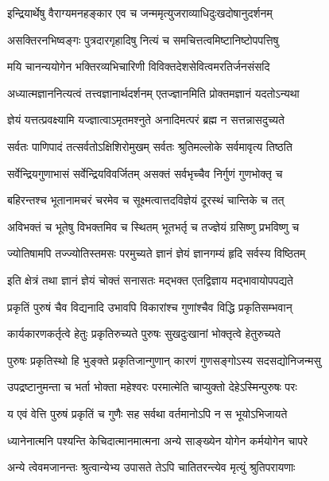 \twolineshloka
{इन्द्रियार्थेषु वैराग्यमनहङ्कार एव च}
{जन्ममृत्युजराव्याधिदुःखदोषानुदर्शनम्}%

\twolineshloka
{असक्तिरनभिष्वङ्गः पुत्रदारगृहादिषु}
{नित्यं च समचित्तत्वमिष्टानिष्टोपपत्तिषु}%

\twolineshloka
{मयि चानन्ययोगेन भक्तिरव्यभिचारिणी}
{विविक्तदेशसेवित्वमरतिर्जनसंसदि}%

\twolineshloka
{अध्यात्मज्ञाननित्यत्वं तत्त्वज्ञानार्थदर्शनम्}
{एतज्ज्ञानमिति प्रोक्तमज्ञानं यदतोऽन्यथा}%

\twolineshloka
{ज्ञेयं यत्तत्प्रवक्ष्यामि यज्ज्ञात्वाऽमृतमश्नुते}
{अनादिमत्परं ब्रह्म न सत्तन्नासदुच्यते}%

\twolineshloka
{सर्वतः पाणिपादं तत्सर्वतोऽक्षिशिरोमुखम्}
{सर्वतः श्रुतिमल्लोके सर्वमावृत्य तिष्ठति}%

\twolineshloka
{सर्वेन्द्रियगुणाभासं सर्वेन्द्रियविवर्जितम्}
{असक्तं सर्वभृच्चैव निर्गुणं गुणभोक्तृ च}%

\twolineshloka
{बहिरन्तश्च भूतानामचरं चरमेव च}
{सूक्ष्मत्वात्तदविज्ञेयं दूरस्थं चान्तिके च तत्}%

\twolineshloka
{अविभक्तं च भूतेषु विभक्तमिव च स्थितम्}
{भूतभर्तृ च तज्ज्ञेयं ग्रसिष्णु प्रभविष्णु च}%

\twolineshloka
{ज्योतिषामपि तज्ज्योतिस्तमसः परमुच्यते}
{ज्ञानं ज्ञेयं ज्ञानगम्यं हृदि सर्वस्य विष्ठितम्}%

\twolineshloka
{इति क्षेत्रं तथा ज्ञानं ज्ञेयं चोक्तं सनासतः}
{मद्भक्त एतद्विज्ञाय मद्भावायोपपद्यते}%

\twolineshloka
{प्रकृतिं पुरुषं चैव विद्यनादि उभावपि}
{विकारांश्च गुणांश्चैव विद्धि प्रकृतिसम्भवान्}%

\twolineshloka
{कार्यकारणकर्तृत्वे हेतुः प्रकृतिरुच्यते}
{पुरुषः सुखदुःखानां भोक्तृत्वे हेतुरुच्यते}%

\twolineshloka
{पुरुषः प्रकृतिस्थो हि भुङ्क्ते प्रकृतिजान्गुणान्}
{कारणं गुणसङ्गोऽस्य सदसद्योनिजन्मसु}%

\twolineshloka
{उपद्रष्टानुमन्ता च भर्ता भोक्ता महेश्वरः}
{परमात्मेति चाप्युक्तो देहेऽस्मिन्पुरुषः परः}%

\twolineshloka
{य एवं वेत्ति पुरुषं प्रकृतिं च गुणैः सह}
{सर्वथा वर्तमानोऽपि न स भूयोऽभिजायते}%

\twolineshloka
{ध्यानेनात्मनि पश्यन्ति केचिदात्मानमात्मना}
{अन्ये साङ्ख्येन योगेन कर्मयोगेन चापरे}%

\twolineshloka
{अन्ये त्वेवमजानन्तः श्रुत्वान्येभ्य उपासते}
{तेऽपि चातितरन्त्येव मृत्युं श्रुतिपरायणाः}%

